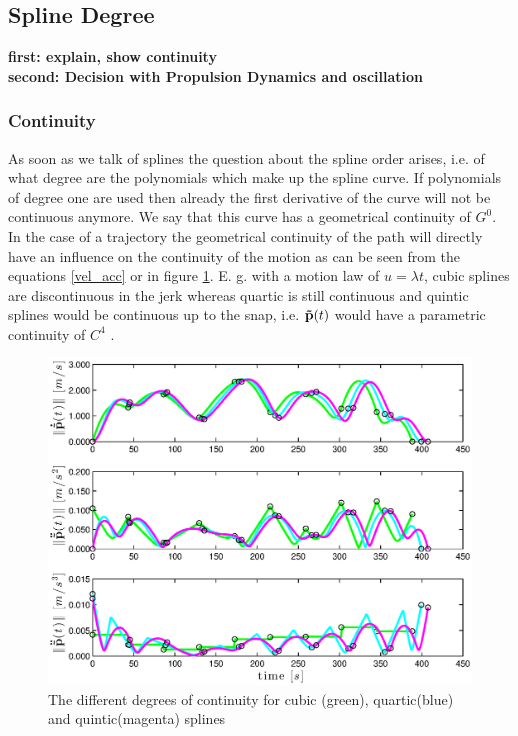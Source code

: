 \subsection{Spline Degree}
{\bf first: explain, show continuity\\
second: Decision with Propulsion Dynamics and oscillation}
\subsubsection{Continuity}
As soon as we talk of splines the question about the spline order arises, i.e. of what degree are the polynomials which make up the spline curve. If polynomials of degree one are used then already the first derivative of the curve will not be continuous anymore. We say that this curve has a geometrical continuity of $G^0$. In the case of a trajectory the geometrical continuity of the path will directly have an influence on the continuity of the motion as can be seen from the equations \eqref{vel_acc} or in figure \ref{fig:continuity}. E. g. with a motion law of $u=\lambda t$, cubic splines are discontinuous in the jerk whereas quartic is still continuous and quintic splines would be continuous up to the snap, i.e. ${\bf \tilde{p}}(t)$ would have a parametric continuity of $C^4$ . 

\begin{figure}[H]
  \begin{minipage}[t]{0.96\textwidth}
    \includegraphics[width = \textwidth]{graphics/continuity.eps}
  \end{minipage}
  \caption{The different degrees of continuity for cubic (green), quartic(blue) and quintic(magenta) splines}
  \label{fig:continuity}
\end{figure}



